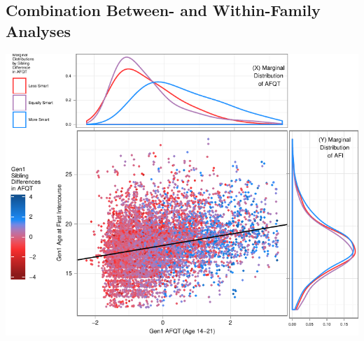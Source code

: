 \documentclass[a4paper,man,apacite,natbib,12pt,longtable,mask]{apa6}\usepackage[]{graphicx}\usepackage[]{color}
\newenvironment{knitrout}{}{} %
\begin{document}
\subsection{Combination Between- and Within-Family Analyses}

%
\begin{landscape}
\noindent\begin{minipage}{\linewidth}
\label{plot_gen1_afi}
\begin{center}
\begin{knitrout}
\color{fgcolor}
\includegraphics[width=.8\paperwidth]{figure/plot_gen1_afi-1} 

\end{knitrout}
\end{center}\end{minipage}\end{landscape}

\end{document}
